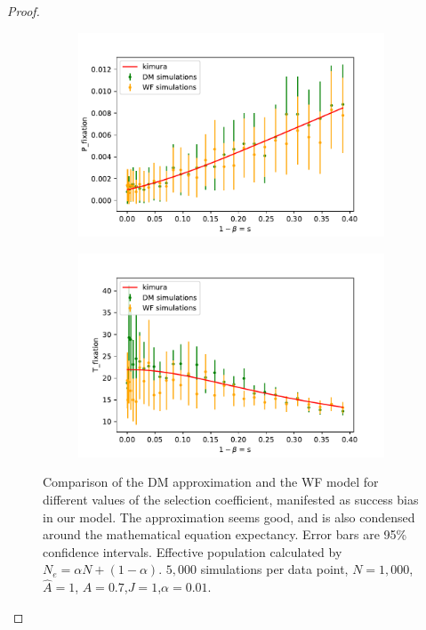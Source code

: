 \documentclass[12pt]{extarticle}
\begin{document}
\begin{proof}
\begin{figure}[t]
  \begin{center}
  \begin{subfigure}[a]{0.49\linewidth}
  \caption{}
    \includegraphics[width=\linewidth]{../figures/binary/fix_prob_var_beta.pdf}
   \end{subfigure}
   \begin{subfigure}[a]{0.49\linewidth}
    \caption{}
    \includegraphics[width=\linewidth]{../figures/binary/fix_time_var_beta.pdf}
   \end{subfigure}
  \end{center}
  \caption{Comparison of the DM approximation and the WF model for different values of the selection coefficient, manifested as success bias in our model. The approximation seems good, and is also condensed around the mathematical equation expectancy. Error bars are 95\% confidence intervals.
  Effective population calculated by $N_e=\alpha N + (1-\alpha)$.
  $5,000$ simulations per data point, $N=1,000$, $\hat{A}=1$, $A=0.7$,$J=1$,$\alpha=0.01$.}
  \label{fig:var_beta}
\end{figure}


\end{proof}
\end{document}
